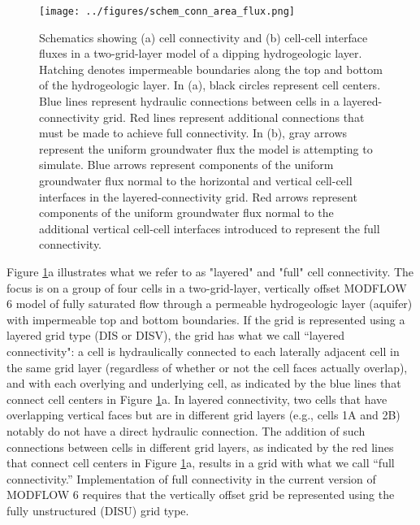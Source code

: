 \documentclass{article}
\begin{document}
\begin{figure}
	\begin{center}
	\texttt{[image: ../figures/schem\_conn\_area\_flux.png]}
	\caption{Schematics showing (a) cell connectivity and (b) cell-cell interface fluxes in a two-grid-layer model of a dipping hydrogeologic layer. Hatching denotes impermeable boundaries along the top and bottom of the hydrogeologic layer. In (a), black circles represent cell centers. Blue lines represent hydraulic connections between cells in a layered-connectivity grid. Red lines represent additional connections that must be made to achieve full connectivity. In (b), gray arrows represent the uniform groundwater flux the model is attempting to simulate. Blue arrows represent components of the uniform groundwater flux normal to the horizontal and vertical cell-cell interfaces in the layered-connectivity grid. Red arrows represent components of the uniform groundwater flux normal to the additional vertical cell-cell interfaces introduced to represent the full connectivity.}
	\label{fig:schem-conn-area-flux}
	\end{center}
\end{figure}

Figure \ref{fig:schem-conn-area-flux}a illustrates what we refer to as "layered" and "full" cell connectivity. The focus is on a group of four cells in a two-grid-layer, vertically offset MODFLOW 6 model of fully saturated flow through a permeable hydrogeologic layer (aquifer) with impermeable top and bottom boundaries. If the grid is represented using a layered grid type (DIS or DISV), the grid has what we call ``layered connectivity": a cell is hydraulically connected to each laterally adjacent cell in the same grid layer (regardless of whether or not the cell faces actually overlap), and with each overlying and underlying cell, as indicated by the blue lines that connect cell centers in Figure \ref{fig:schem-conn-area-flux}a. In layered connectivity, two cells that have overlapping vertical faces but are in different grid layers (e.g., cells 1A and 2B) notably do not have a direct hydraulic connection. The addition of such connections between cells in different grid layers, as indicated by the red lines that connect cell centers in Figure \ref{fig:schem-conn-area-flux}a, results in a grid with what we call ``full connectivity.''  Implementation of full connectivity in the current version of MODFLOW 6 \citep{modflow650software} requires that the vertically offset grid be represented using the fully unstructured (DISU) grid type.
\end{document}
